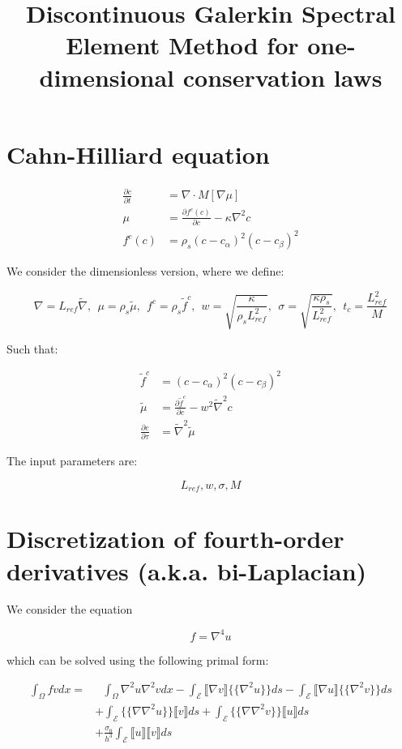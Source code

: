 \documentclass[10pt,a4paper]{article}
\title{\textbf{Discontinuous Galerkin Spectral Element Method for one-dimensional conservation laws}}
\begin{document}
\tableofcontents
\section{Cahn-Hilliard equation}

\begin{align}
\frac{\partial c}{\partial t}&=\nabla\cdot M[\nabla \mu]\\
\mu &= \frac{\partial f^c(c)}{\partial c} - \kappa \nabla^2 c \\
f^c(c)&=\rho_s(c-c_\alpha)^2(c-c_\beta)^2
\end{align}

We consider the dimensionless version, where we define:

\begin{equation}
\nabla = L_{ref}\tilde{\nabla},~~ \mu = \rho_s\tilde{\mu},~~f^c = \rho_s\tilde{f}^c,~~w=\sqrt{\frac{\kappa}{\rho_s L_{ref}^2}},~~ \sigma = \sqrt{\frac{\kappa\rho_s}{L_{ref}^2}},~~t_c = \frac{L_{ref}^2}{M}
\end{equation}

Such that:

\begin{align}
\tilde{f}^c &= (c-c_\alpha)^2(c-c_\beta)^2\\
\tilde{\mu} &= \frac{\partial \tilde{f}^c}{\partial c} - w^2 \tilde{\nabla}^2 c\\
\frac{\partial c}{\partial \tau} &= \tilde{\nabla}^2 \tilde{\mu}
\end{align}

The input parameters are:

\begin{equation}
L_{ref}, w, \sigma, M
\end{equation}

\section{Discretization of fourth-order derivatives (a.k.a. bi-Laplacian)}

We consider the equation

\begin{equation}
f = \nabla^4 u
\end{equation}

which can be solved using the following primal form:

\begin{equation}
\begin{split}
\int_{\Omega}fvdx =&~~~ \int_{\Omega}\nabla^2 u \nabla^2 vdx - \int_{\mathcal{E}}\llbracket\nabla v \rrbracket \{\!\{\nabla^2 u\}\!\}ds - \int_{\mathcal{E}}\llbracket \nabla u\rrbracket \{\!\{\nabla^2 v\}\!\}ds\\
&+\int_{\mathcal{E}}\{\!\{\nabla\nabla^2 u\}\!\}\llbracket v\rrbracket ds + \int_{\mathcal{E}}\{\!\{\nabla \nabla^2 v\}\!\}\llbracket u\rrbracket ds \\
&+\frac{\sigma_0}{h^3}\int_{\mathcal{E}}\llbracket u\rrbracket \llbracket v\rrbracket ds
\end{split}
\end{equation}
\end{document}
